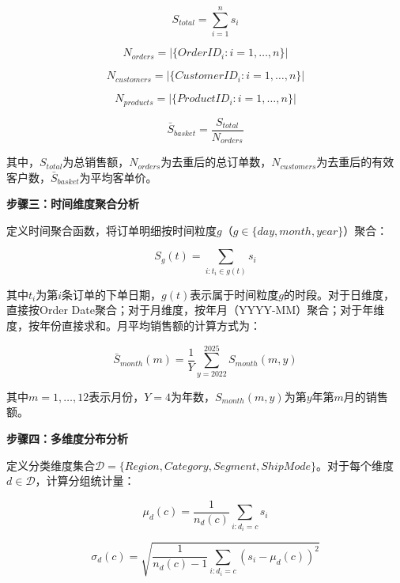 \begin{equation}
S_{total} = \sum_{i=1}^{n} s_i
\end{equation}

\begin{equation}
N_{orders} = \left|\{OrderID_i : i=1,\ldots,n\}\right|
\end{equation}

\begin{equation}
N_{customers} = \left|\{CustomerID_i : i=1,\ldots,n\}\right|
\end{equation}

\begin{equation}
N_{products} = \left|\{ProductID_i : i=1,\ldots,n\}\right|
\end{equation}

\begin{equation}
\bar{S}_{basket} = \frac{S_{total}}{N_{orders}}
\end{equation}

其中，$S_{total}$为总销售额，$N_{orders}$为去重后的总订单数，$N_{customers}$为去重后的有效客户数，$\bar{S}_{basket}$为平均客单价。

\textbf{步骤三：时间维度聚合分析}

定义时间聚合函数，将订单明细按时间粒度$g$（$g \in \{day, month, year\}$）聚合：

\begin{equation}
S_g(t) = \sum_{i: t_i \in g(t)} s_i
\end{equation}

其中$t_i$为第$i$条订单的下单日期，$g(t)$表示属于时间粒度$g$的时段。对于日维度，直接按Order Date聚合；对于月维度，按年月（YYYY-MM）聚合；对于年维度，按年份直接求和。月平均销售额的计算方式为：

\begin{equation}
\bar{S}_{month}(m) = \frac{1}{Y} \sum_{y=2022}^{2025} S_{month}(m, y)
\end{equation}

其中$m=1,\ldots,12$表示月份，$Y=4$为年数，$S_{month}(m, y)$为第$y$年第$m$月的销售额。

\textbf{步骤四：多维度分布分析}

定义分类维度集合$\mathcal{D} = \{Region, Category, Segment, ShipMode\}$。对于每个维度$d \in \mathcal{D}$，计算分组统计量：

\begin{equation}
\mu_d(c) = \frac{1}{n_d(c)} \sum_{i: d_i = c} s_i
\end{equation}

\begin{equation}
\sigma_d(c) = \sqrt{\frac{1}{n_d(c)-1} \sum_{i: d_i = c} (s_i - \mu_d(c))^2}
\end{equation}

